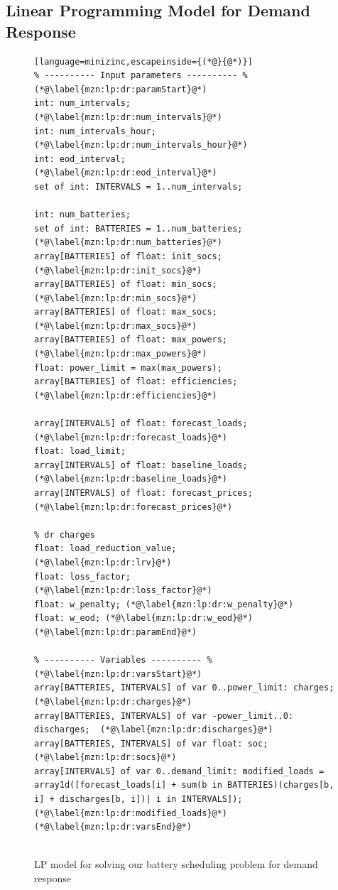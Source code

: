 \subsection{Linear Programming Model for Demand Response}
\label{dr:method:model}

\begin{figure}[hp!]
	\centering
	\caption{\gls{LP} model for solving our battery scheduling problem for demand response}
	\label{dr:method:lp}
	\begin{lstlisting}[language=minizinc,escapeinside={(*@}{@*)}]
% ---------- Input parameters ---------- % (*@\label{mzn:lp:dr:paramStart}@*) 		
int: num_intervals; 			(*@\label{mzn:lp:dr:num_intervals}@*)
int: num_intervals_hour;    (*@\label{mzn:lp:dr:num_intervals_hour}@*)
int: eod_interval; 				(*@\label{mzn:lp:dr:eod_interval}@*) 
set of int: INTERVALS = 1..num_intervals; 

int: num_batteries;
set of int: BATTERIES = 1..num_batteries;			(*@\label{mzn:lp:dr:num_batteries}@*)
array[BATTERIES] of float: init_socs;   	  	    	  (*@\label{mzn:lp:dr:init_socs}@*)
array[BATTERIES] of float: min_socs;   					(*@\label{mzn:lp:dr:min_socs}@*)
array[BATTERIES] of float: max_socs;   				   (*@\label{mzn:lp:dr:max_socs}@*)
array[BATTERIES] of float: max_powers;   	 	   (*@\label{mzn:lp:dr:max_powers}@*)
float: power_limit = max(max_powers);			
array[BATTERIES] of float: efficiencies;				(*@\label{mzn:lp:dr:efficiencies}@*)

array[INTERVALS] of float: forecast_loads;					(*@\label{mzn:lp:dr:forecast_loads}@*)
float: load_limit;
array[INTERVALS] of float: baseline_loads;    (*@\label{mzn:lp:dr:baseline_loads}@*)
array[INTERVALS] of float: forecast_prices;          (*@\label{mzn:lp:dr:forecast_prices}@*)

% dr charges
float: load_reduction_value;							     (*@\label{mzn:lp:dr:lrv}@*)
float: loss_factor;													  (*@\label{mzn:lp:dr:loss_factor}@*)
float: w_penalty; (*@\label{mzn:lp:dr:w_penalty}@*) 
float: w_eod; (*@\label{mzn:lp:dr:w_eod}@*) 	(*@\label{mzn:lp:dr:paramEnd}@*)

% ---------- Variables ---------- % (*@\label{mzn:lp:dr:varsStart}@*)
array[BATTERIES, INTERVALS] of var 0..power_limit: charges;        (*@\label{mzn:lp:dr:charges}@*)
array[BATTERIES, INTERVALS] of var -power_limit..0: discharges;  (*@\label{mzn:lp:dr:discharges}@*)
array[BATTERIES, INTERVALS] of var float: soc;								 (*@\label{mzn:lp:dr:socs}@*)
array[INTERVALS] of var 0..demand_limit: modified_loads = array1d([forecast_loads[i] + sum(b in BATTERIES)(charges[b, i] + discharges[b, i])| i in INTERVALS]);  (*@\label{mzn:lp:dr:modified_loads}@*) (*@\label{mzn:lp:dr:varsEnd}@*)
		

\end{lstlisting}
\end{figure}
